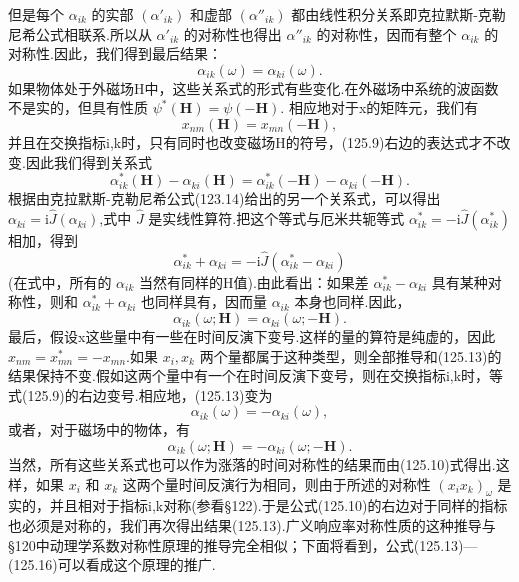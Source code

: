 但是每个 $\alpha_{ik}$ 的实部 $(\alpha'_{ik})$ 和虚部 $(\alpha''_{ik})$ 都由线性积分关系即克拉默斯-克勒尼希公式相联系.所以从 $\alpha'_{ik}$ 的对称性也得出 $\alpha''_{ik}$ 的对称性，因而有整个 $\alpha_{ik}$ 的对称性.因此，我们得到最后结果：
\begin{equation}
  \alpha_{ik}(\omega)=\alpha_{ki}(\omega).
\end{equation}
如果物体处于外磁场H中，这些关系式的形式有些变化.在外磁场中系统的波函数不是实的，但具有性质 $\psi^*(\boldsymbol{H})=\psi(-\boldsymbol{H})$. 相应地对于x的矩阵元，我们有
\begin{equation*}
  x_{nm}(\boldsymbol{H})=x_{mn}(-\boldsymbol{H}),
\end{equation*}
并且在交换指标i,k时，只有同时也改变磁场H的符号，(125.9)右边的表达式才不改变.因此我们得到关系式
\begin{equation*}
  \alpha_{ik}^*(\boldsymbol{H})-\alpha_{ki}(\boldsymbol{H})
  =\alpha_{ik}^*(-\boldsymbol{H})-\alpha_{ki}(-\boldsymbol{H}).
\end{equation*}
根据由克拉默斯-克勒尼希公式(123.14)给出的另一个关系式，可以得出 $\alpha_{ki}=\mathrm{i}\hat{J}(\alpha_{ki})$,式中 $\hat{J}$ 是实线性算符.把这个等式与厄米共轭等式 $\alpha_{ik}^*=-\mathrm{i}\hat{J}(\alpha_{ik}^*)$ 相加，得到
\begin{equation*}
  \alpha_{ik}^*+\alpha_{ki}=-\mathrm{i}\hat{J}(\alpha_{ik}^*-\alpha_{ki})
\end{equation*}
(在式中，所有的 $\alpha_{ik}$ 当然有同样的H值).由此看出：如果差 $\alpha_{ik}^*-\alpha_{ki}$ 具有某种对称性，则和 $\alpha_{ik}^*+\alpha_{ki}$ 也同样具有，因而量 $\alpha_{ik}$ 本身也同样.因此，
\begin{equation}
  \alpha_{ik}(\omega;\boldsymbol{H})
  =\alpha_{ki}(\omega;-\boldsymbol{H}).
\end{equation}
最后，假设x这些量中有一些在时间反演下变号.这样的量的算符是纯虚的，因此 $x_{nm}=x_{mn}^*=-x_{mn}$.如果 $x_i, x_k$ 两个量都属于这种类型，则全部推导和(125.13)的结果保持不变.假如这两个量中有一个在时间反演下变号，则在交换指标i,k时，等式(125.9)的右边变号.相应地，(125.13)变为
\begin{equation}
  \alpha_{ik}(\omega)=-\alpha_{ki}(\omega),
\end{equation}
或者，对于磁场中的物体，有
\begin{equation}
  \alpha_{ik}(\omega;\boldsymbol{H})
  =-\alpha_{ki}(\omega;-\boldsymbol{H}).
\end{equation}
当然，所有这些关系式也可以作为涨落的时间对称性的结果而由(125.10)式得出.这样，如果 $x_i$ 和 $x_k$ 这两个量时间反演行为相同，则由于所述的对称性 $(x_ix_k)_\omega$ 是实的，并且相对于指标i,k对称(参看§122).于是公式(125.10)的右边对于同样的指标也必须是对称的，我们再次得出结果(125.13).广义响应率对称性质的这种推导与§120中动理学系数对称性原理的推导完全相似；下面将看到，公式(125.13)—(125.16)可以看成这个原理的推广.

